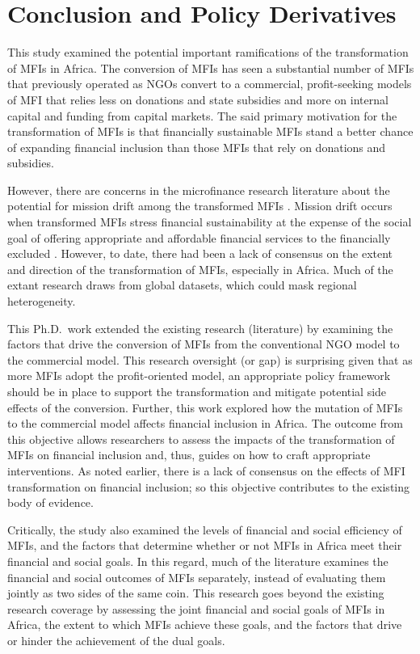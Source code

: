 \documentclass[a4paper, nobind]{templates/ociamthesis}
\begin{document}
\hypertarget{conclusion-and-policy-derivatives}{%
\chapter{Conclusion and Policy Derivatives}\label{conclusion-and-policy-derivatives}}

This study examined the potential important ramifications of the transformation of MFIs in Africa. The conversion of MFIs has seen a substantial number of MFIs that previously operated as NGOs convert to a commercial, profit-seeking models of MFI that relies less on donations and state subsidies and more on internal capital and funding from capital markets. The said primary motivation for the transformation of MFIs is that financially sustainable MFIs stand a better chance of expanding financial inclusion than those MFIs that rely on donations and subsidies.

However, there are concerns in the microfinance research literature about the potential for mission drift among the transformed MFIs \autocite{armendariz2011mission,serrano2014microfinance}. Mission drift occurs when transformed MFIs stress financial sustainability at the expense of the social goal of offering appropriate and affordable financial services to the financially excluded \autocite{d2017ngos}. However, to date, there had been a lack of consensus on the extent and direction of the transformation of MFIs, especially in Africa. Much of the extant research draws from global datasets, which could mask regional heterogeneity.

This Ph.D.~work extended the existing research (literature) by examining the factors that drive the conversion of MFIs from the conventional NGO model to the commercial model. This research oversight (or gap) is surprising given that as more MFIs adopt the profit-oriented model, an appropriate policy framework should be in place to support the transformation and mitigate potential side effects of the conversion. Further, this work explored how the mutation of MFIs to the commercial model affects financial inclusion in Africa. The outcome from this objective allows researchers to assess the impacts of the transformation of MFIs on financial inclusion and, thus, guides on how to craft appropriate interventions. As noted earlier, there is a lack of consensus on the effects of MFI transformation on financial inclusion; so this objective contributes to the existing body of evidence.

Critically, the study also examined the levels of financial and social efficiency of MFIs, and the factors that determine whether or not MFIs in Africa meet their financial and social goals. In this regard, much of the literature examines the financial and social outcomes of MFIs separately, instead of evaluating them jointly as two sides of the same coin. This research goes beyond the existing research coverage by assessing the joint financial and social goals of MFIs in Africa, the extent to which MFIs achieve these goals, and the factors that drive or hinder the achievement of the dual goals.
\end{document}
